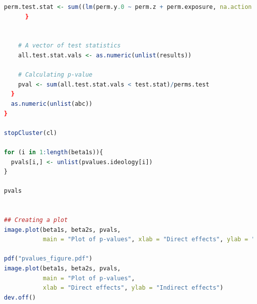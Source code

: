 \documentclass[12pt]{article}
\begin{document}
\begin{lstlisting}[language=R]
      perm.test.stat <- sum((lm(perm.y.0 ~ perm.z + perm.exposure, na.action = na.omit)$resid)^2)
      }
    
    
    # A vector of test statistics
    all.test.stat.vals <- as.numeric(unlist(results))
    
    # Calculating p-value
    pval <- sum(all.test.stat.vals < test.stat)/perms.test
  }
  as.numeric(unlist(abc))
}

stopCluster(cl)

for (i in 1:length(beta1s)){
  pvals[i,] <- unlist(pvalues.ideology[i])
}

pvals


## Creating a plot
image.plot(beta1s, beta2s, pvals,
           main = "Plot of p-values", xlab = "Direct effects", ylab = "Indirect effects")

pdf("pvalues_figure.pdf")
image.plot(beta1s, beta2s, pvals,
           main = "Plot of p-values",
           xlab = "Direct effects", ylab = "Indirect effects")
dev.off()


\end{lstlisting}


\clearpage


\end{document}
